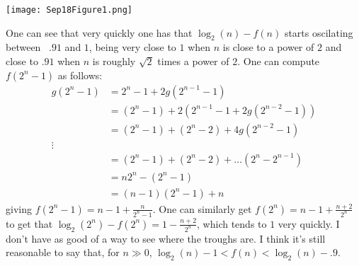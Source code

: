 \documentclass[11pt]{article}
\theoremstyle{definition}
\begin{document}
\texttt{[image: Sep18Figure1.png]}

One can see that very quickly one has that $\log_2(n)-f(n)$ starts oscilating between ~$.91$ and $1$, being very close to $1$ when $n$ is close to a power of $2$ and close to $.91$ when $n$ is roughly $\sqrt{2}$ times a power of $2$.  One can compute $f(2^n-1)$ as follows:
\begin{align*}
g(2^n-1) & = 2^n - 1 + 2 g(2^{n-1}-1) \\
& = (2^n - 1) + 2(2^{n-1} - 1 + 2 g(2^{n-2}-1))\\
& = (2^n - 1) + (2^n - 2) + 4g(2^{n-2}-1) \\
\vdots\\
& = (2^n-1) + (2^n-2) + \ldots (2^n - 2^{n-1}) \\
& = n2^n - (2^n-1) \\
& = (n-1)(2^n-1) + n
\end{align*}
giving $f(2^n-1) = n-1 + \frac{n}{2^n-1}$.  One can similarly get $f(2^n) = n-1 + \frac{n+2}{2^n}$ to get that $\log_2(2^n)-f(2^n) = 1-\frac{n+2}{2^n}$, which tends to $1$ very quickly.  I don't have as good of a way to see where the troughs are.  I think it's still reasonable to say that, for $n \gg 0$, $\log_2(n)-1 < f(n) < \log_2(n) -.9$.
\end{document}
